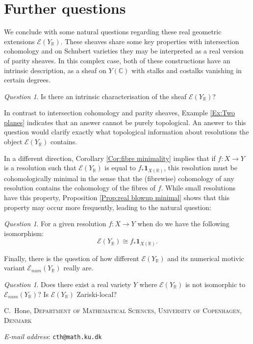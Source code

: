 \documentclass{amsart}
\makeatletter
\theoremstyle{definition}
\theoremstyle{remark}
\newtheorem{question}[thm]{Question}
\newcommand{\Addresses}{{%
  \bigskip
  \footnotesize
  C.~Hone, \textsc{Department of Mathematical Sciences, University of Copenhagen, Denmark}\par\nopagebreak
  \textit{E-mail address}: \texttt{cth@math.ku.dk}
}}
\makeatother
\begin{document}
\section{Further questions}\label{Sec:Further questions}

We conclude with some natural questions regarding these real geometric extensions $\mathscr{E}(Y_\mathbb{R})$. These sheaves share some key properties with intersection cohomology and on Schubert varieties they may be interpreted as a real version of parity sheaves. In this complex case, both of these constructions have an intrinsic description, as a sheaf on $Y(\mathbb{C})$ with stalks and costalks vanishing in certain degrees.

\begin{question}
Is there an intrinsic characterisation of the sheaf $\mathscr{E}(Y_\mathbb{R})$? 
\end{question}

In contrast to intersection cohomology and parity sheaves, Example \ref{Ex:Two planes} indicates that an answer cannot be purely topological. An answer to this question would clarify exactly what topological information about resolutions the object $\mathscr{E}(Y_\mathbb{R})$ contains. 

In a different direction, Corollary \ref{Cor:fibre minimality} implies that if $f:X\to Y$ is a resolution such that $\mathscr{E}(Y_\mathbb{R})$ is equal to $f_*\mathbf{1}_{X(\mathbb{R})}$, this resolution must be cohomologically minimal in the sense that the (fibrewise) cohomology of any resolution contains the cohomology of the fibres of $f$. While small resolutions have this property, Proposition \ref{Prop:real blowup minimal} shows that this property may occur more frequently, leading to the natural question:

\begin{question}
For a given resolution $f:X\to Y$ when do we have the following isomorphism: \[\mathscr{E}(Y_\mathbb{R})\cong f_*\mathbf{1}_{X(\mathbb{R})}.\]
\end{question}

Finally, there is the question of how different $\mathscr{E}(Y_\mathbb{R})$ and its numerical motivic variant $\mathscr{E}_{num}(Y_\mathbb{R})$ really are.
\begin{question}
Does there exist a real variety $Y$ where $\mathscr{E}(Y_\mathbb{R})$ is not isomorphic to $\mathscr{E}_{num}(Y_\mathbb{R})$? Is $\mathscr{E}(Y_\mathbb{R})$ Zariski-local? 
\end{question}




\Addresses
\end{document}
